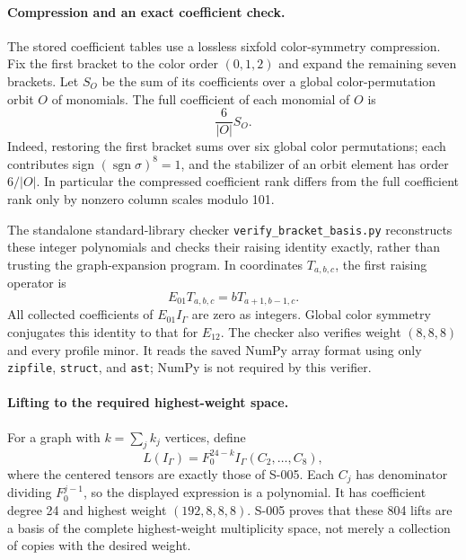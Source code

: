 \paragraph{Compression and an exact coefficient check.}
The stored coefficient tables use a lossless sixfold color-symmetry
compression.  Fix the first bracket to the color order $(0,1,2)$ and
expand the remaining seven brackets.  Let $S_O$ be the sum of its
coefficients over a global color-permutation orbit $O$ of monomials.
The full coefficient of each monomial of $O$ is
\[
                             \frac6{|O|}S_O.
\]
Indeed, restoring the first bracket sums over six global color
permutations; each contributes sign $(\operatorname{sgn}\sigma)^8=1$,
and the stabilizer of an orbit element has order $6/|O|$.
In particular the compressed coefficient rank differs from the full
coefficient rank only by nonzero column scales modulo 101.

The standalone standard-library checker
\texttt{verify\_bracket\_basis.py} reconstructs these integer
polynomials and checks their raising identity exactly, rather than
trusting the graph-expansion program.  In coordinates
$T_{a,b,c}$, the first raising operator is
\[
                  E_{01}T_{a,b,c}=bT_{a+1,b-1,c}.
\]
All collected coefficients of $E_{01}I_\Gamma$ are zero as integers.
Global color symmetry conjugates this identity to that for $E_{12}$.
The checker also verifies weight $(8,8,8)$ and every profile minor.
It reads the saved NumPy array format using only
\texttt{zipfile}, \texttt{struct}, and \texttt{ast}; NumPy is not
required by this verifier.

\paragraph{Lifting to the required highest-weight space.}
For a graph with $k=\sum_jk_j$ vertices, define
\[
                    L(I_\Gamma)=F_0^{24-k}I_\Gamma(C_2,\ldots,C_8),
\]
where the centered tensors are exactly those of S-005.
Each $C_j$ has denominator dividing $F_0^{j-1}$, so the displayed
expression is a polynomial.  It has coefficient degree 24 and
highest weight $(192,8,8,8)$.  S-005 proves that these 804 lifts are a
basis of the complete highest-weight multiplicity space, not merely a
collection of copies with the desired weight.

